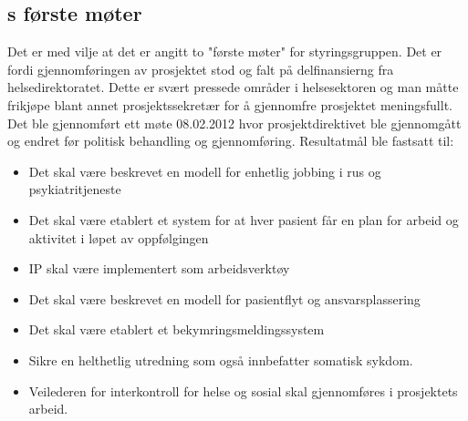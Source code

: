 \documentclass[11pt]{report} %
\begin{document}
                  \subsection{s første møter}\label{sec:stygr_1}
                 Det er med vilje at det er angitt to "første møter" for styringsgruppen. Det er fordi gjennomføringen av prosjektet stod og falt på delfinansierng fra helsedirektoratet. Dette er svært pressede områder i helsesektoren og man måtte frikjøpe blant annet prosjektssekretær for å gjennomfre prosjektet meningsfullt. \\
                 Det ble gjennomført ett møte 08.02.2012 hvor prosjektdirektivet\cite{ProPlan-1} ble gjennomgått og endret før politisk behandling og gjennomføring. Resultatmål ble fastsatt til:
                  \begin{itemize}
                  \item Det skal være beskrevet en modell for enhetlig jobbing i rus og psykiatritjeneste\\
                  \item Det skal være etablert et system for at hver pasient får en plan for arbeid og aktivitet i løpet av oppfølgingen\\
                  \item IP skal være implementert som arbeidsverktøy\\
                  \item Det skal være beskrevet en modell for pasientflyt og ansvarsplassering\\
                  \item Det skal være etablert et bekymringsmeldingssystem\\
                  \item Sikre en helthetlig utredning som også innbefatter somatisk sykdom.\\
                  \item Veilederen for interkontroll for helse og sosial skal gjennomføres i prosjektets arbeid.\\
                  \end{itemize}
\end{document}
